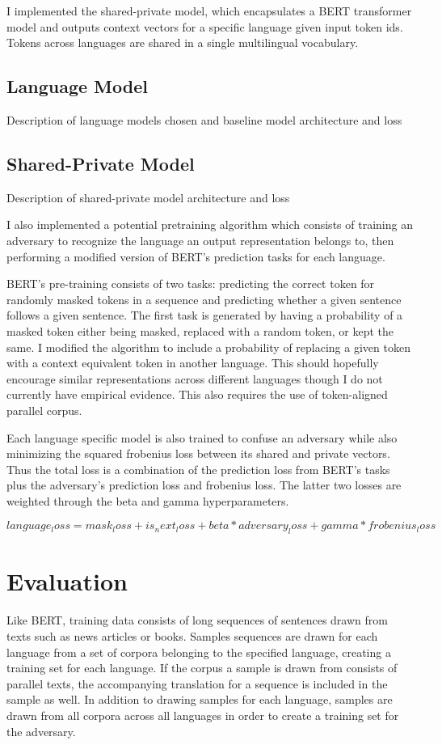 \documentclass[12pt,letterpaper]{article}
\begin{document}
\begin{multicols}{2}
I implemented the shared-private model, which encapsulates a BERT transformer model and outputs context vectors for a specific language given input token ids.  Tokens across languages are shared in a single multilingual vocabulary.

\subsection{Language Model}
Description of language models chosen and baseline model architecture and loss

\subsection{Shared-Private Model}
Description of shared-private model architecture and loss

I also implemented a potential pretraining algorithm which consists of training an adversary to recognize the language an output representation belongs to, then performing a modified version of BERT’s prediction tasks for each language.

BERT’s pre-training consists of two tasks: predicting the correct token for randomly masked tokens in a sequence and predicting whether a given sentence follows a given sentence.  The first task is generated by having a probability of a masked token either being masked, replaced with a random token, or kept the same.  I modified the algorithm to include a probability of replacing a given token with a context equivalent token in another language. This should hopefully encourage similar representations across different languages though I do not currently have empirical evidence.  This also requires the use of token-aligned parallel corpus.

Each language specific model is also trained to confuse an adversary while also minimizing the squared frobenius loss between its shared and private vectors.  Thus the total loss is a combination of the prediction loss from BERT’s tasks plus the adversary’s prediction loss and frobenius loss.  The latter two losses are weighted through the beta and gamma hyperparameters.

$language_loss = mask_loss + is_next_loss + beta * adversary_loss + gamma * frobenius_loss$

\section{Evaluation}
Like BERT, training data consists of long sequences of sentences drawn from texts such as news articles or books.  Samples sequences are drawn for each language from a set of corpora belonging to the specified language, creating a training set for each language.  If the corpus a sample is drawn from consists of parallel texts, the accompanying translation for a sequence is included in the sample as well.  In addition to drawing samples for each language, samples are drawn from all corpora across all languages in order to create a training set for the adversary.


\end{multicols}
\end{document}
